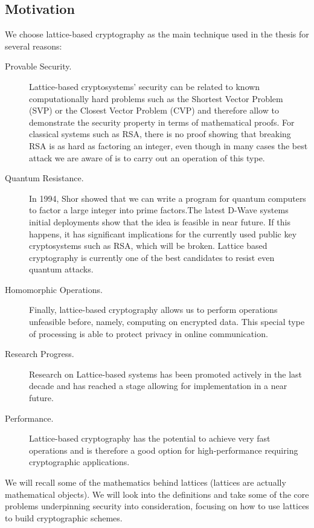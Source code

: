 \subsection{Motivation}
\label{ssub:The motivations}
We choose lattice-based cryptography as the main technique used in the
thesis for several reasons:
\begin{description}
\item[Provable Security.] Lattice-based cryptosystems' security can be related
  to known computationally hard problems such as the Shortest Vector Problem (SVP)
  or the Closest Vector Problem (CVP) and therefore allow to demonstrate the security
  property in terms of mathematical proofs. For classical systems such as RSA,
  there is no proof showing that breaking RSA is as hard as factoring an integer,
  even though in many cases the best attack we are aware of is to carry out an operation of this type.
\item[Quantum Resistance.] In 1994, Shor \cite{shor1994algorithms} showed that
  we can write a program for quantum computers to factor a large integer
  into prime factors.The latest D-Wave systems initial deployments show that the
  idea is feasible in near future. If this happens, it has significant
  implications for the currently used public key cryptosystems such as RSA, which
  will be broken. Lattice based cryptography is currently one of the best
  candidates to resist even quantum attacks.
\item[Homomorphic Operations.] Finally, lattice-based cryptography allows us to
  perform operations unfeasible before, namely, computing on encrypted data. This
  special type of processing is able to protect privacy in online
  communication.
\item[Research Progress.] Research on Lattice-based systems has been promoted actively
  in the last decade and has reached a stage allowing for
  implementation in a near future.
\item[Performance.] Lattice-based cryptography has the potential to achieve very
  fast operations and is therefore a good option for high-performance requiring
  cryptographic applications.
\end{description}
We will recall some of the mathematics behind lattices (lattices are actually
mathematical objects). We will look into the definitions and take some of the core
problems underpinning security into consideration, focusing on how to use lattices to build
cryptographic schemes.



